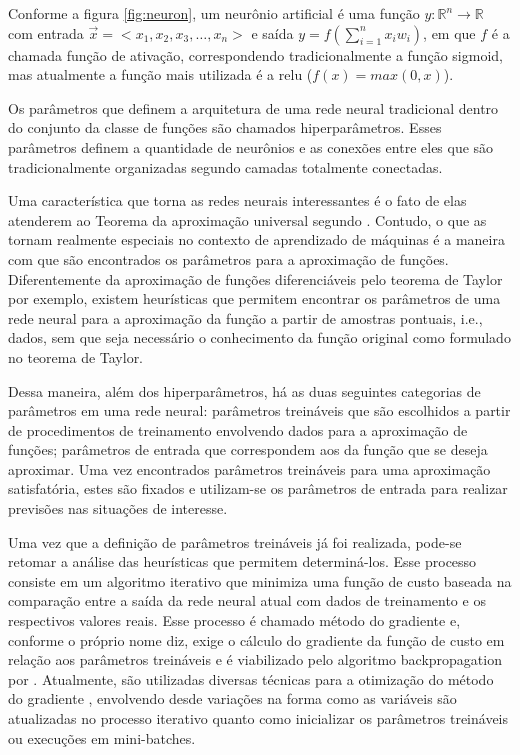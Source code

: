 Conforme a figura \ref{fig:neuron}, um neurônio artificial é uma função $y:\mathbb R^n \rightarrow \mathbb R$ com entrada $\vec x = <x_1,x_2,x_3,\dots,x_n>$ e saída $y = f(\sum\limits_{i=1}^n x_iw_i)$, em que $f$ é a chamada função de ativação, correspondendo tradicionalmente a função sigmoid, mas atualmente a função mais utilizada é a relu ($f(x) = max(0, x)$).

Os parâmetros que definem a arquitetura de uma rede neural tradicional dentro do conjunto da classe de funções são chamados hiperparâmetros. Esses parâmetros definem a quantidade de neurônios e as conexões entre eles que são tradicionalmente organizadas segundo camadas totalmente conectadas.

Uma característica que torna as redes neurais interessantes é o fato de elas atenderem ao Teorema da aproximação universal segundo \cite{HORNIK1991251}. Contudo, o que as tornam realmente especiais no contexto de aprendizado de máquinas é a maneira com que são encontrados os parâmetros para a aproximação de funções. Diferentemente da aproximação de funções diferenciáveis pelo teorema de Taylor por exemplo, existem heurísticas que permitem encontrar os parâmetros de uma rede neural para a aproximação da função a partir de amostras pontuais, i.e., dados, sem que seja necessário o conhecimento da função original como formulado no teorema de Taylor.

Dessa maneira, além dos hiperparâmetros, há as duas seguintes categorias de parâmetros em uma rede neural: parâmetros treináveis que são escolhidos a partir de procedimentos de treinamento envolvendo dados para a aproximação de funções; parâmetros de entrada que correspondem aos da função que se deseja aproximar. Uma vez encontrados parâmetros treináveis para uma aproximação satisfatória, estes são fixados e utilizam-se os parâmetros de entrada para realizar previsões nas situações de interesse.

Uma vez que a definição de parâmetros treináveis já foi realizada, pode-se retomar a análise das heurísticas que permitem determiná-los. Esse processo consiste em um algoritmo iterativo que minimiza uma função de custo baseada na comparação entre a saída da rede neural atual com dados de treinamento e os respectivos valores reais. Esse processo é chamado método do gradiente e, conforme o próprio nome diz, exige o cálculo do gradiente da função de custo em relação aos parâmetros treináveis e é viabilizado pelo algoritmo backpropagation por \cite{Rumelhart1986}. Atualmente, são utilizadas diversas técnicas para a otimização do método do gradiente \cite{DBLP:journals/corr/Ruder16}, envolvendo desde variações na forma como as variáveis são atualizadas no processo iterativo quanto como inicializar os parâmetros treináveis ou execuções em mini-batches.


